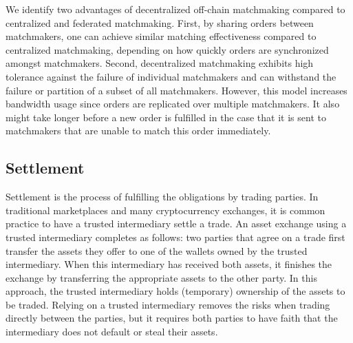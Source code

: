 

We identify two advantages of decentralized off-chain matchmaking compared to centralized and federated matchmaking.
First, by sharing orders between matchmakers, one can achieve similar matching effectiveness compared to centralized matchmaking, depending on how quickly orders are synchronized amongst matchmakers.
Second, decentralized matchmaking exhibits high tolerance against the failure of individual matchmakers and can withstand the failure or partition of a subset of all matchmakers.
However, this model increases bandwidth usage since orders are replicated over multiple matchmakers.
It also might take longer before a new order is fulfilled in the case that it is sent to matchmakers that are unable to match this order immediately.

\subsection{Settlement}
Settlement is the process of fulfilling the obligations by trading parties.
In traditional marketplaces and many cryptocurrency exchanges, it is common practice to have a trusted intermediary settle a trade.
An asset exchange using a trusted intermediary completes as follows: two parties that agree on a trade first transfer the assets they offer to one of the wallets owned by the trusted intermediary.
When this intermediary has received both assets, it finishes the exchange by transferring the appropriate assets to the other party.
In this approach, the trusted intermediary holds (temporary) ownership of the assets to be traded.
Relying on a trusted intermediary removes the risks when trading directly between the parties, but it requires both parties to have faith that the intermediary does not default or steal their assets.

